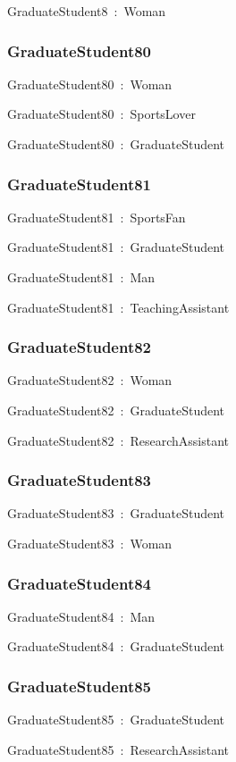 \documentclass{article}
\begin{document}
GraduateStudent8~:~Woman

\subsubsection*{GraduateStudent80}

GraduateStudent80~:~Woman

GraduateStudent80~:~SportsLover

GraduateStudent80~:~GraduateStudent

\subsubsection*{GraduateStudent81}

GraduateStudent81~:~SportsFan

GraduateStudent81~:~GraduateStudent

GraduateStudent81~:~Man

GraduateStudent81~:~TeachingAssistant

\subsubsection*{GraduateStudent82}

GraduateStudent82~:~Woman

GraduateStudent82~:~GraduateStudent

GraduateStudent82~:~ResearchAssistant

\subsubsection*{GraduateStudent83}

GraduateStudent83~:~GraduateStudent

GraduateStudent83~:~Woman

\subsubsection*{GraduateStudent84}

GraduateStudent84~:~Man

GraduateStudent84~:~GraduateStudent

\subsubsection*{GraduateStudent85}

GraduateStudent85~:~GraduateStudent

GraduateStudent85~:~ResearchAssistant
\end{document}

